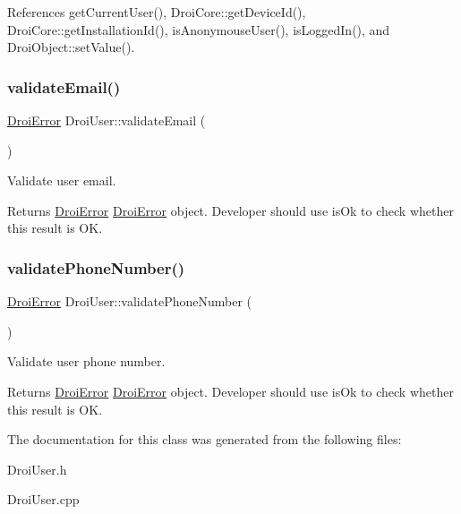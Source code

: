References get\+Current\+User(), Droi\+Core\+::get\+Device\+Id(), Droi\+Core\+::get\+Installation\+Id(), is\+Anonymouse\+User(), is\+Logged\+In(), and Droi\+Object\+::set\+Value().

\mbox{\label{class_droi_user_a1c908092717de36c51b0561546fc76b1}} 
\subsubsection{\texorpdfstring{validate\+Email()}{validateEmail()}}
{\footnotesize\ttfamily \hyperlink{class_droi_error}{Droi\+Error} Droi\+User\+::validate\+Email (\begin{DoxyParamCaption}{ }\end{DoxyParamCaption})}

Validate user email.

\begin{DoxyReturn}{Returns}
\hyperlink{class_droi_error}{Droi\+Error} \hyperlink{class_droi_error}{Droi\+Error} object. Developer should use is\+Ok to check whether this result is OK. 
\end{DoxyReturn}
\mbox{\label{class_droi_user_a771f0ed19004d3565fdc6b7663d0a566}} 
\subsubsection{\texorpdfstring{validate\+Phone\+Number()}{validatePhoneNumber()}}
{\footnotesize\ttfamily \hyperlink{class_droi_error}{Droi\+Error} Droi\+User\+::validate\+Phone\+Number (\begin{DoxyParamCaption}{ }\end{DoxyParamCaption})}

Validate user phone number.

\begin{DoxyReturn}{Returns}
\hyperlink{class_droi_error}{Droi\+Error} \hyperlink{class_droi_error}{Droi\+Error} object. Developer should use is\+Ok to check whether this result is OK. 
\end{DoxyReturn}


The documentation for this class was generated from the following files\+:\begin{DoxyCompactItemize}
\item 
Droi\+User.\+h\item 
Droi\+User.\+cpp\end{DoxyCompactItemize}
